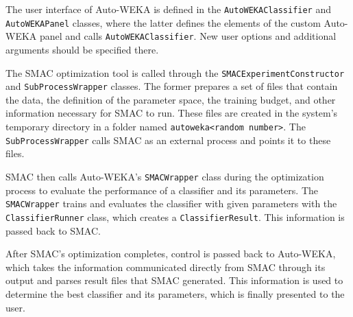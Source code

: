 \documentclass{article}
\begin{document}
The user interface of Auto-WEKA is defined in the \verb=AutoWEKAClassifier= and
\verb=AutoWEKAPanel= classes, where the latter defines the elements of the
custom Auto-WEKA panel and calls \verb=AutoWEKAClassifier=. New user options and
additional arguments should be specified there.

The SMAC optimization tool is called through the
\verb=SMACExperimentConstructor= and \verb=SubProcessWrapper= classes. The
former prepares a set of files that contain the data, the definition of the
parameter space, the training budget, and other information necessary for SMAC
to run. These files are created in the system's temporary directory in a folder
named \verb=autoweka<random number>=. The \verb=SubProcessWrapper= calls SMAC as
an external process and points it to these files.

SMAC then calls Auto-WEKA's \verb=SMACWrapper= class during the optimization
process to evaluate the performance of a classifier and its parameters. The
\verb=SMACWrapper= trains and evaluates the classifier with given parameters
with the \verb=ClassifierRunner= class, which creates a \verb=ClassifierResult=.
This information is passed back to SMAC.

After SMAC's optimization completes, control is passed back to Auto-WEKA, which
takes the information communicated directly from SMAC through its output and
parses result files that SMAC generated. This information is used to determine
the best classifier and its parameters, which is finally presented to the user.

\appendix


\end{document}
